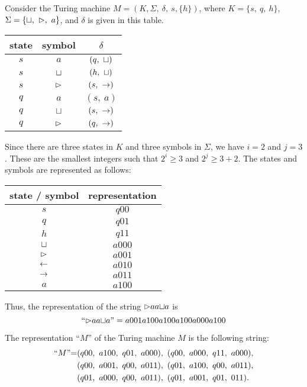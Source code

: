 \begin{example}{}
Consider the Turing machine $M = (K,\Sigma,\ \delta,\ s, \{ h \})$, where $K = \{ s,\ q,\ h \}$, $\Sigma = \{ \sqcup,\ \vartriangleright,\ a \}$, and $\delta$ is given in this table.
\begin{table}[H]
  \centering
  \begin{tabular}{|cc|c|}
    \hline
    state & symbol & $\delta$ \\
    \hline
    $s$ & $a$ & $(q,\ \blank)$ \\
    $s$ & $\sqcup$ & $(h,\ \blank)$ \\
    $s$ & $\vartriangleright$ & $(s,\ \ra)$ \\
    $q$ & $a$ & $(s,\ a)$ \\
    $q$ & $\sqcup$ & $(s,\ \ra)$ \\
    $q$ & $\vartriangleright$ & $(q,\ \ra)$ \\
    \hline
  \end{tabular}
\end{table}
\quad Since there are three states in $K$ and three symbols in $\Sigma$, we have $i = 2$ and $j = 3$. These are the smallest integers such that $2^i \geq 3$ and $2^j \geq 3 + 2$. The states and symbols are represented as follows:
\begin{table}[H]
  \centering
  \begin{tabular}{|c|c|}
    \hline
    state / symbol & representation \\
    \hline
    $s$       & $q00$  \\
    $q$       & $q01$  \\
    $h$       & $q11$  \\
    $\sqcup$  & $a000$ \\
    $\vartriangleright$    & $a001$  \\
    $\leftarrow$     & $a010$  \\
    $\rightarrow$     & $a011$  \\
    $a$       & $a100$  \\
    \hline
  \end{tabular}
\end{table}
Thus, the representation of the string ${\vartriangleright}aa{\sqcup}a$ is
\begin{equation*}
  \textnormal{``}{\vartriangleright}aa{\sqcup}a\textnormal{''} = a001a100a100a100a000a100
\end{equation*}

The representation ``$M$'' of the Turing machine $M$ is the following string:
\begin{align*}
  \textnormal{``$M$''=} &(q00,\ a100,\ q01,\ a000),\ (q00,\ a000,\ q11,\ a000),\\
                         &(q00,\ a001,\ q00,\ a011),\ (q01,\ a100,\ q00,\ a011),\\
                         &(q01,\ a000,\ q00,\ a011),\ (q01,\ a001,\ q01,\ 011).
\end{align*}
\end{example}

